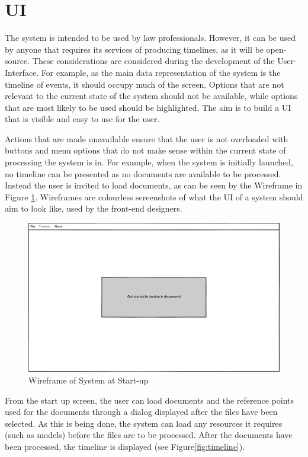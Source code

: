 \section{UI}
\par The system is intended to be used by law professionals. However, it can be used by anyone that requires its services of producing timelines, as it will be open-source.  These considerations are considered during the development of the User-Interface. For example, as the main data representation of the system is the timeline of events, it should occupy much of the screen. Options that are not relevant to the current state of the system should not be available, while options that are most likely to be used should be highlighted. The aim is to build a UI that is visible and easy to use for the user.
\par Actions that are made unavailable ensure that the user is not overloaded with buttons and menu options that do not make sense within the current state of processing the system is in. For example, when the system is initially launched, no timeline can be presented as no documents are available to be processed. Instead the user is invited to load documents, as can be seen by the Wireframe in Figure \ref{fig:startup}. Wireframes are colourless screenshots of what the UI of a system should aim to look like, used by the front-end designers.
\begin{figure}[h]
\caption{Wireframe of System at Start-up}
\label{fig:startup}
\includegraphics[width=\linewidth]{startup.png}
\centering
\end{figure}
\par From the start up screen, the user can load documents and the reference points used for the documents through a dialog displayed after the files have been selected. As this is being done, the system can load any resources it requires (such as models) before the files are to be processed. After the documents have been processed, the timeline is displayed (see Figure\ref{fig:timeline}).
